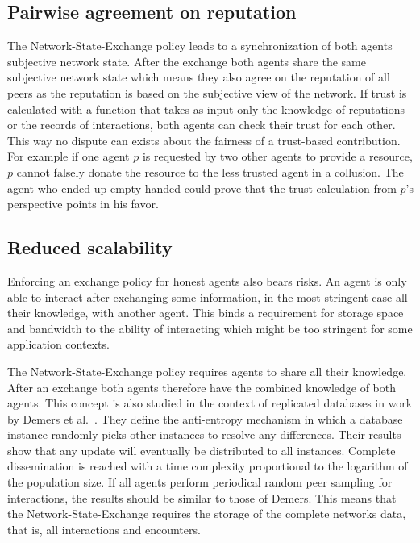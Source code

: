 \subsection{Pairwise agreement on reputation}
The Network-State-Exchange policy leads to a synchronization of both agents subjective network state.
After the exchange both agents share the same subjective network state which means they also agree
on the reputation of all peers as the reputation is based on the subjective view of the network.
If trust is calculated with a function that takes as input only the knowledge of reputations or the
records of interactions, both agents can check their trust for each other. This way no dispute can 
exists about the fairness of a trust-based contribution. For example if one agent $p$ is requested by 
two other agents to provide a resource, $p$ cannot falsely donate the resource to the less 
trusted agent in a collusion. The agent who ended up empty handed could prove that the trust 
calculation from $p$'s perspective points in his favor.

\subsection{Reduced scalability}
\label{sec:storage}
Enforcing an exchange policy for honest agents also bears risks. An agent is only able to interact
after exchanging some information, in the most stringent case all their knowledge, with another agent. 
This binds a requirement for storage space and bandwidth to the ability of interacting which might 
be too stringent for some application contexts. 

The Network-State-Exchange policy requires agents to share all their knowledge. After an exchange 
both agents therefore have the combined knowledge of both agents. This concept is also studied in the context
of replicated databases in work by Demers et al.\ \cite{demers1987epidemic}. They define the anti-entropy
mechanism in which a database instance randomly picks other instances to resolve any differences. 
Their results show that any update will eventually be distributed to all instances. Complete 
dissemination is reached with a time complexity proportional to the logarithm of the population 
size. If all agents perform periodical random peer sampling for interactions, the results should 
be similar to those of Demers. This means that the Network-State-Exchange requires the storage of 
the complete networks data, that is, all interactions and encounters. 

